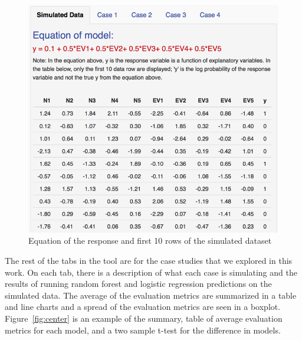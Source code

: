 \documentclass{llncs}
\begin{document}
\begin{figure}
\centering
\includegraphics[scale=0.75]{dataset.png}
\caption{Equation of the response and first 10 rows of the simulated dataset}
\label{fig:dataset}
\end{figure}

\noindent 
The rest of the tabs in the tool are for the case studies that we explored in this work.  On each tab, there is a description of what each case is simulating and the results of running random forest and logistic regression predictions on the simulated data.  The average of the evaluation metrics are summarized in a table and line charts and a spread of the evaluation metrics are seen in a boxplot. Figure~\ref{fig:center} is an example of the summary, table of average evaluation metrics for each model, and a two sample t-test for the difference in models.
\end{document}

